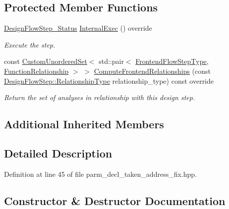 \subsection*{Protected Member Functions}
\begin{DoxyCompactItemize}
\item 
\hyperlink{design__flow__step_8hpp_afb1f0d73069c26076b8d31dbc8ebecdf}{Design\+Flow\+Step\+\_\+\+Status} \hyperlink{classparm__decl__taken__address__fix_afeaf66df2e6c884ca04ae5410298d052}{Internal\+Exec} () override
\begin{DoxyCompactList}\small\item\em Execute the step. \end{DoxyCompactList}\item 
const \hyperlink{classCustomUnorderedSet}{Custom\+Unordered\+Set}$<$ std\+::pair$<$ \hyperlink{frontend__flow__step_8hpp_afeb3716c693d2b2e4ed3e6d04c3b63bb}{Frontend\+Flow\+Step\+Type}, \hyperlink{classFrontendFlowStep_af7cf30f2023e5b99e637dc2058289ab0}{Function\+Relationship} $>$ $>$ \hyperlink{classparm__decl__taken__address__fix_affc75bf0b1646b76619ad58804f64bd0}{Compute\+Frontend\+Relationships} (const \hyperlink{classDesignFlowStep_a723a3baf19ff2ceb77bc13e099d0b1b7}{Design\+Flow\+Step\+::\+Relationship\+Type} relationship\+\_\+type) const override
\begin{DoxyCompactList}\small\item\em Return the set of analyses in relationship with this design step. \end{DoxyCompactList}\end{DoxyCompactItemize}
\subsection*{Additional Inherited Members}


\subsection{Detailed Description}


Definition at line 45 of file parm\+\_\+decl\+\_\+taken\+\_\+address\+\_\+fix.\+hpp.



\subsection{Constructor \& Destructor Documentation}
\mbox{\label{classparm__decl__taken__address__fix_aa1e7ca2ebe935f87fc9f2019544cce88}} 
